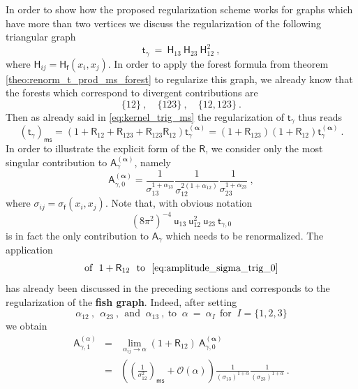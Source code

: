 \documentclass[11pt]{book}
\newcommand{\ms}{\mathsf{ms}}
\newcommand{\alphabd}{\boldsymbol{\alpha}}
\newcommand{\Ocal}{\mathcal{O}}
\newcommand{\Asf}{\mathsf{A}}
\newcommand{\Hsf}{\mathsf{H}}
\newcommand{\Rsf}{\mathsf{R}}
\newcommand{\fsf}{\mathsf{f}}
\newcommand{\tsf}{\mathsf{t}}
\newcommand{\usf}{\mathsf{u}}
\theoremstyle{break}
\begin{document}
In order to show how the proposed regularization scheme works for graphs which have more than two vertices we discuss the regularization of the following triangular graph
%
\begin{equation*}
\tsf_\gamma \ = \ \Hsf_{13} \ \Hsf_{23} \ \Hsf_{12}^2 \ , 
\end{equation*}
%
where $\Hsf_{ij} = \Hsf_\fsf(x_i,x_j)$. In order to apply the forest formula from theorem \ref{theo:renorm_t_prod_ms_forest} to regularize this graph, we already know that the forests which correspond to divergent contributions are 
%
\begin{equation*}
\{12\} \ , \quad \{123\} \ , \quad \{12,123\} \ .
\end{equation*} 
%
Then as already said in \eqref{eq:kernel_trig_ms} the regularization of $\tsf_\gamma$ thus reads
%
\begin{equation*}
\left(\tsf_\gamma\right)_\ms = \left(1+\Rsf_{12}+\Rsf_{123}+\Rsf_{123}\Rsf_{12}\right) \tsf^{(\alphabd)}_\gamma = (1+\Rsf_{123})(1+\Rsf_{12}) \tsf^{(\alphabd)}_\gamma \ .
\end{equation*}
%
In order to illustrate the explicit form of the $\Rsf$, we consider only the most singular contribution to $\Asf^{(\alphabd)}_\gamma$, namely
%
\begin{equation}
\Asf_{\gamma,0}^{(\alphabd)} = \frac{1}{\sigma_{13}^{1+\alpha_{13}}} \frac{1}{\sigma_{12}^{2(1+\alpha_{12})}} \frac{1}{\sigma_{23}^{1+\alpha_{23}}} \ ,
\label{eq:amplitude_sigma_trig_0}
\end{equation}
%
where $\sigma_{ij} = \sigma_\fsf(x_i,x_j)$. Note that, with obvious notation
%
\begin{equation*}
(8\pi^2)^{-4} \ \usf_{13} \ \usf^2_{12} \ \usf_{23} \ \tsf_{\gamma,0}
\end{equation*}
%
is in fact the only contribution to $\Asf_\gamma$ which needs to be renormalized. The application  
%
\begin{equation*}
\mbox{of } \ 1 + \Rsf_{12} \ \mbox{ to } \ \eqref{eq:amplitude_sigma_trig_0}
\end{equation*}
% 
has already been discussed in the preceding sections and corresponds to the regularization of the \textbf{fish graph}. Indeed, after setting 
%
\begin{equation*}
\alpha_{12} \ , \ \ \alpha_{23} \ , \ \ \mbox{and } \ \alpha_{13} \ , \ \mbox{to } \ \alpha \ = \ \alpha_I \ \ \mbox{for } \ I=\{1,2,3\} 
\end{equation*}
%
we obtain
%
\begin{eqnarray}
\Asf_{\gamma,1}^{(\alpha)} 
&=& \lim_{\alpha_{ij}\to\alpha} (1+\Rsf_{12}) \ \Asf_{\gamma,0}^{(\alphabd)} \nonumber \\
&=& \left(\left(\frac{1}{\sigma_{12}^2}\right)_\ms + \Ocal(\alpha)\right) \frac{1}{(\sigma_{13})^{1+\alpha}} \frac{1}{(\sigma_{23})^{1+\alpha}} \ .
\label{eq:amplitude_sigma_trig_1}
\end{eqnarray}
\end{document}
